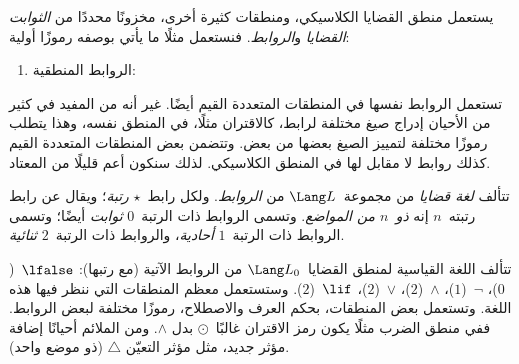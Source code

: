 \documentclass[../../../include/open-logic-section]{subfiles}
\begin{document}


يستعمل منطق القضايا الكلاسيكي، ومنطقات كثيرة أخرى، مخزونًا محددًا من
\emph{الثوابت القضايا} و\emph{الروابط}. فنستعمل مثلًا ما يأتي بوصفه
رموزًا أولية:
\begin{enumerate}
\item الروابط المنطقية:
  \startycommalist
\end{enumerate}

تستعمل الروابط نفسها في المنطقات المتعددة القيم أيضًا. غير أنه من
المفيد في كثير من الأحيان إدراج صيغ مختلفة لرابط، كالاقتران مثلًا،
في المنطق نفسه، وهذا يتطلب رموزًا مختلفة لتمييز الصيغ بعضها من بعض.
وتتضمن بعض المنطقات المتعددة القيم كذلك روابط لا مقابل لها في المنطق
الكلاسيكي. لذلك سنكون أعم قليلًا من المعتاد.

\begin{defn}
  تتألف \emph{لغة قضايا} من مجموعة~$\Lang L$ من \emph{الروابط}.
  ولكل رابط~$\star$ \emph{رتبة}؛ ويقال عن رابط رتبته~$n$ إنه
  \emph{ذو~$n$ من المواضع}. وتسمى الروابط ذات الرتبة~$0$
  \emph{ثوابت} أيضًا؛ وتسمى الروابط ذات الرتبة~$1$ \emph{أحادية}،
  والروابط ذات الرتبة~$2$ \emph{ثنائية}.
\end{defn}

\begin{ex}
  تتألف اللغة القياسية لمنطق القضايا~$\Lang L_0$ من الروابط الآتية
  (مع رتبها):
  $\lfalse$~($0$)،
  $\lnot$~($1$)،
  $\land$~($2$)،
  $\lor$~($2$)،
  $\lif$~($2$). وستستعمل معظم المنطقات التي ننظر فيها هذه اللغة.
  وتستعمل بعض المنطقات، بحكم العرف والاصطلاح، رموزًا مختلفة لبعض
  الروابط. ففي منطق الضرب مثلًا يكون رمز الاقتران غالبًا~$\odot$ بدل
  $\land$. ومن الملائم أحيانًا إضافة مؤثر جديد، مثل مؤثر التعيّن
  $\triangle$ (ذو موضع واحد).
\end{ex}
\end{document}
